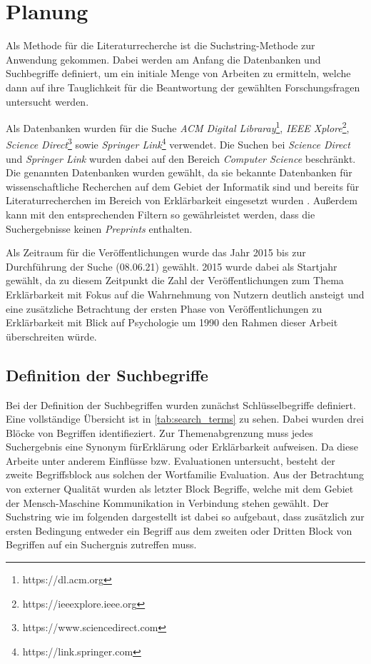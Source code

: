 \section{Planung}

Als Methode für die Literaturrecherche ist die Suchstring-Methode zur Anwendung gekommen. Dabei werden am Anfang die Datenbanken und Suchbegriffe definiert, um ein initiale Menge von Arbeiten zu ermitteln, welche dann auf ihre Tauglichkeit für die Beantwortung der gewählten Forschungsfragen untersucht werden.

Als Datenbanken wurden für die Suche \textit{ACM Digital Libraray}\footnote{https://dl.acm.org}, \textit{IEEE Xplore}\footnote{https://ieeexplore.ieee.org}, \textit{Science Direct}\footnote{https://www.sciencedirect.com} sowie \textit{Springer Link}\footnote{https://link.springer.com} verwendet. Die Suchen bei \textit{Science Direct} und \textit{Springer Link} wurden dabei auf den Bereich \textit{Computer Science} beschränkt. Die genannten Datenbanken wurden gewählt, da sie bekannte Datenbanken für wissenschaftliche Recherchen auf dem Gebiet der Informatik sind \cite{carvalho2017quality} und bereits für Literaturrecherchen im Bereich von Erklärbarkeit eingesetzt wurden \cite{nunes_systematic_2017}. Außerdem kann mit den entsprechenden Filtern so gewährleistet werden, dass die Suchergebnisse keinen \textit{Preprints} enthalten.

Als Zeitraum für die Veröffentlichungen wurde das Jahr 2015 bis zur Durchführung der Suche (08.06.21) gewählt. 2015 wurde dabei als Startjahr gewählt, da zu diesem Zeitpunkt die Zahl der Veröffentlichungen zum Thema Erklärbarkeit mit Fokus auf die Wahrnehmung von Nutzern deutlich ansteigt und eine zusätzliche Betrachtung der ersten Phase von Veröffentlichungen zu Erklärbarkeit mit Blick auf Psychologie um 1990 den Rahmen dieser Arbeit überschreiten würde.

\subsection{Definition der Suchbegriffe}

Bei der Definition der Suchbegriffen wurden zunächst Schlüsselbegriffe definiert. Eine vollständige Übersicht ist in \autoref{tab:search_terms} zu sehen. Dabei wurden drei Blöcke von Begriffen identifieziert. Zur Themenabgrenzung muss jedes Suchergebnis eine Synonym für\glqq Erklärung\grqq{} oder \glqq Erklärbarkeit\grqq{} aufweisen. Da diese Arbeite unter anderem Einflüsse bzw. Evaluationen untersucht, besteht der zweite Begriffsblock aus solchen der Wortfamilie \glqq Evaluation\grqq{}. Aus der Betrachtung von externer Qualität wurden als letzter Block Begriffe, welche mit dem Gebiet der Mensch-Maschine Kommunikation in Verbindung stehen gewählt. Der Suchstring wie im folgenden dargestellt ist dabei so aufgebaut, dass zusätzlich zur ersten Bedingung entweder ein Begriff aus dem zweiten oder Dritten Block von Begriffen auf ein Suchergnis zutreffen muss.

